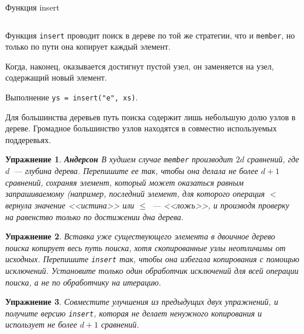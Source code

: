 \documentclass[aspectratio=169
  , xcolor={svgnames}
  , hyperref={ colorlinks,citecolor=DeepPink4
             , linkcolor=DarkRed,urlcolor=DarkBlue}
  , russian
  ]{beamer}
\theoremstyle{exerciseStyle1}
\newtheorem{exercise}{\textbf{Упражнение}}[section]
\begin{document}
\begin{frame}[fragile]{Функция insert}
\inputminted[firstline=27, lastline=30] {haskell}{code/SearchTree.hs}

Функция \lstinline{insert} проводит поиск в дереве по той же стратегии,
что и \lstinline{member}, но только по пути она копирует каждый
элемент.

Когда, наконец, оказывается достигнут пустой узел, он
заменяется на узел, содержащий новый элемент.
 
\end{frame}

\begin{frame}[fragile]{}
\begin{minipage}{.48\textwidth}
		\par
\end{minipage}
\begin{minipage}{.48\textwidth}
	
\end{minipage}
Выполнение \texttt{ys = insert("e", xs)}. 

Для большинства деревьев путь
поиска содержит лишь небольшую долю узлов в дереве. Громадное
большинство узлов находятся в совместно используемых поддеревьях.
\end{frame}

\begin{frame}
\begin{exercise}\textbf{Андерсон \cite{Andersson1991}}\label{ex:2.2}
  В худшем случае \lstinline{member} производит $2d$ сравнений, где
  $d$~--- глубина дерева. Перепишите ее так, чтобы она делала не более
  $d+1$ сравнений, сохраняя элемент, который \emph{может} оказаться
  равным запрашиваемому (например, последний элемент, для которого
  операция $<$ вернула значение <<истина>> или $\le$~--- <<ложь>>, и
  производя проверку на равенство только по достижении дна дерева.
\end{exercise}

\begin{exercise}\label{ex:2.3}
  Вставка уже существующего элемента в двоичное дерево поиска копирует
  весь путь поиска, хотя скопированные узлы неотличимы от
  исходных. Перепишите \lstinline{insert} так, чтобы она избегала
  копирования с помощью исключений. Установите только один обработчик
  исключений для всей операции поиска, а не по обработчику на итерацию.
\end{exercise}

\begin{exercise}\label{ex:2.4}
  Совместите улучшения из предыдущих двух упражнений, и получите
  версию \lstinline{insert}, которая не делает ненужного копирования и
  использует не более $d+1$ сравнений.
\end{exercise}
\end{frame}
\end{document}
